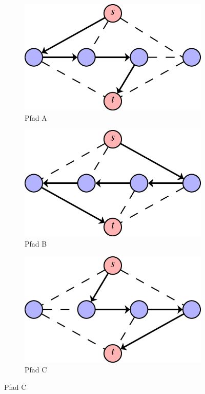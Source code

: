 \begin{figure}[H]
	\centering
	\begin{subfigure}[H]{0.3\linewidth}
		\includegraphics[width=\linewidth]{25/Grafik/PfadA}
		\caption{Pfad A}
	\end{subfigure}
	\begin{subfigure}[H]{0.3\linewidth}
		\includegraphics[width=\linewidth]{25/Grafik/PfadB}
		\caption{Pfad B}
		
	\end{subfigure}
	\begin{subfigure}[H]{0.3\linewidth}
		\includegraphics[width=\linewidth]{25/Grafik/PfadC}
		\caption{Pfad C}

	\end{subfigure}
\end{figure}
